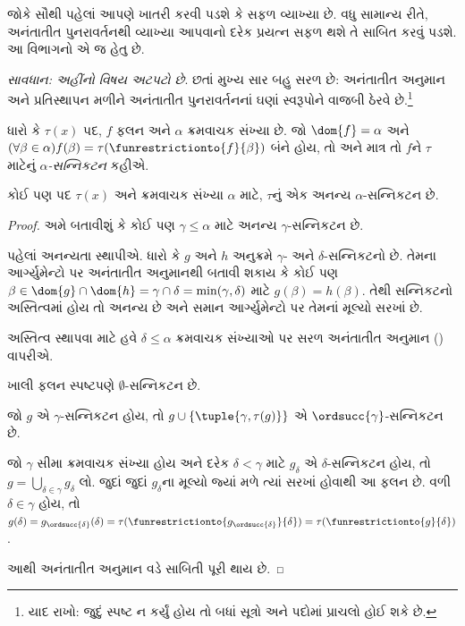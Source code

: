 \documentclass[../../../include/open-logic-section]{subfiles}
\begin{document}

જોકે સૌથી પહેલાં આપણે ખાતરી કરવી પડશે કે
 સફળ વ્યાખ્યા છે. વધુ સામાન્ય રીતે,
અનંતાતીત પુનરાવર્તનથી વ્યાખ્યા આપવાનો દરેક પ્રયત્ન સફળ થશે તે
સાબિત કરવું પડશે. આ વિભાગનો એ જ હેતુ છે.

\emph{સાવધાન: અહીંનો વિષય અટપટો છે}. છતાં મુખ્ય સાર બહુ સરળ છે:
અનંતાતીત અનુમાન અને પ્રતિસ્થાપન મળીને અનંતાતીત પુનરાવર્તનનાં
ઘણાં સ્વરૂપોને વાજબી ઠેરવે છે.\footnote{યાદ રાખો: જુદું સ્પષ્ટ ન
કર્યું હોય તો બધાં સૂત્રો અને પદોમાં પ્રાચલો હોઈ શકે છે.}

\begin{defn}
	ધારો કે $\tau(x)$ પદ, $f$ ફલન અને $\alpha$ ક્રમવાચક સંખ્યા છે.
	જો $\dom{f} = \alpha$ અને $(\forall \beta \in \alpha)f(\beta) = \tau(\funrestrictionto{f}{\beta})$ બંને હોય,
	તો અને માત્ર તો $f$ને $\tau$ માટેનું \emph{$\alpha$-સન્નિકટન} કહીએ.
\end{defn}

\begin{lem}[મર્યાદિત પુનરાવર્તન]
કોઈ પણ પદ $\tau(x)$ અને ક્રમવાચક સંખ્યા $\alpha$ માટે,
$\tau$નું એક અનન્ય $\alpha$-સન્નિકટન છે.
\end{lem}
\begin{proof}
અમે બતાવીશું કે કોઈ પણ $\gamma \leq \alpha$ માટે અનન્ય
$\gamma$-સન્નિકટન છે.

પહેલાં અનન્યતા સ્થાપીએ. ધારો કે $g$ અને $h$ અનુક્રમે
$\gamma$- અને $\delta$-સન્નિકટનો છે. તેમના આર્ગ્યુમેન્ટો પર
અનંતાતીત અનુમાનથી બતાવી શકાય કે કોઈ પણ
$\beta \in \dom{g} \cap \dom{h} =
\gamma \cap \delta = \min(\gamma, \delta)$ માટે
$g(\beta) = h(\beta)$. તેથી સન્નિકટનો અસ્તિત્વમાં હોય તો
અનન્ય છે અને સમાન આર્ગ્યુમેન્ટો પર તેમનાં મૂલ્યો સરખાં છે.

અસ્તિત્વ સ્થાપવા માટે હવે $\delta \leq \alpha$ ક્રમવાચક
સંખ્યાઓ પર સરળ અનંતાતીત અનુમાન
() વાપરીએ.

ખાલી ફલન સ્પષ્ટપણે $\emptyset$-સન્નિકટન છે.

જો $g$ એ $\gamma$-સન્નિકટન હોય, તો $g \cup
\{\tuple{\gamma, \tau(g)}\}$ એ $\ordsucc{\gamma}$-સન્નિકટન છે.

જો $\gamma$ સીમા ક્રમવાચક સંખ્યા હોય અને દરેક $\delta < \gamma$
માટે $g_\delta$ એ $\delta$-સન્નિકટન હોય, તો
$g = \bigcup_{\delta \in \gamma} g_\delta$ લો. જુદાં જુદાં
$g_\delta$ના મૂલ્યો જ્યાં મળે ત્યાં સરખાં હોવાથી આ ફલન છે.
વળી $\delta \in \gamma$ હોય, તો
$g(\delta) = g_{\ordsucc{\delta}}(\delta) =
\tau(\funrestrictionto{g_{\ordsucc{\delta}}}{\delta}) =
\tau(\funrestrictionto{g}{\delta})$.

આથી અનંતાતીત અનુમાન વડે સાબિતી પૂરી થાય છે.
\end{proof}
\end{document}
